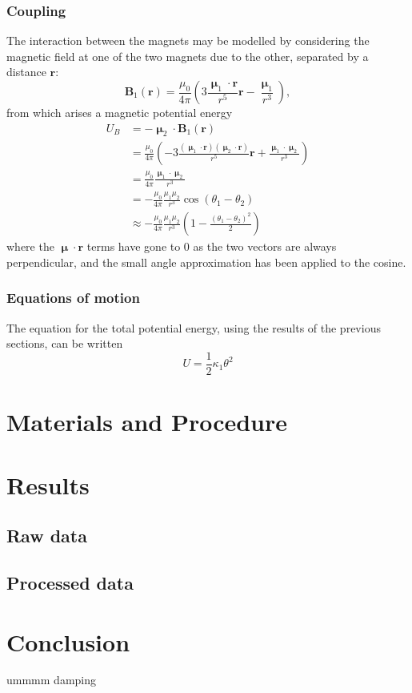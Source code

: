 \documentclass{article}
\begin{document}
\subsubsection{Coupling}
The interaction between the magnets may be modelled by considering the magnetic field at one of the two magnets due to the other, separated by a distance $\mathbf{r}$:
\begin{equation}
    \mathbf{B}_1(\mathbf{r}) = \frac{\mu_0}{4\pi}\left( 3\frac{\bm{\upmu}_1\cdot\mathbf{r}}{r^5}\mathbf{r} - \frac{\bm{\upmu}_1}{r^3} \right),
\end{equation}
from which arises a magnetic potential energy
\begin{equation}
    \begin{aligned}
        U_B &= -\bm{\upmu}_2\cdot \mathbf{B}_1(\mathbf{r}) \\
            &= \frac{\mu_0}{4\pi}\left( -3\frac{(\bm{\upmu}_1\cdot\mathbf{r})(\bm{\upmu}_2\cdot\mathbf{r})}{r^5}\mathbf{r} + \frac{\bm{\upmu}_1\cdot\bm{\upmu}_2}{r^3} \right) \\
            &= \frac{\mu_0}{4\pi}\frac{\bm{\upmu}_1\cdot\bm{\upmu}_2}{r^3} \\
            &= -\frac{\mu_0}{4\pi}\frac{\mu_1\mu_2}{r^3}\cos(\theta_1 - \theta_2) \\
            &\approx -\frac{\mu_0}{4\pi}\frac{\mu_1\mu_2}{r^3} \left( 1 - \frac{(\theta_1 - \theta_2)^2}{2} \right)
    \end{aligned}
\end{equation}
where the $\bm{\upmu}\cdot \mathbf{r}$ terms have gone to 0 as the two vectors are always perpendicular, and the small angle approximation has been applied to the cosine.

\subsubsection{Equations of motion}
The equation for the total potential energy, using the results of the previous sections, can be written
\begin{equation}
    U = \frac{1}{2}\kappa_1\theta^2
\end{equation}

\section{Materials and Procedure}


\section{Results}
\subsection{Raw data}
\subsection{Processed data}

\section{Conclusion}
ummmm damping
\end{document}
